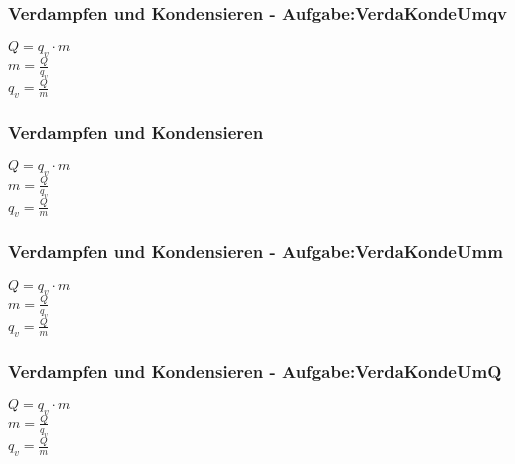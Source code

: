 \subsubsection{Verdampfen und Kondensieren - Aufgabe:VerdaKondeUmqv} 
\begin{minipage}{0.45\textwidth} 
$ Q =q_{v} \cdot m $\\ 
$ m = \frac{Q}{q_{v} } $\\ 
$ q_{v}  = \frac{Q}{m} $\\ 
\end{minipage} 
\begin{minipage}{0.45\textwidth} 
 
\end{minipage} 
\subsubsection{Verdampfen und Kondensieren} 
\begin{minipage}{0.45\textwidth} 
$ Q =q_{v} \cdot m $\\ 
$ m = \frac{Q}{q_{v} } $\\ 
$ q_{v}  = \frac{Q}{m} $\\ 
\end{minipage} 
\begin{minipage}{0.45\textwidth} 
 
\end{minipage} 
\subsubsection{Verdampfen und Kondensieren - Aufgabe:VerdaKondeUmm} 
\begin{minipage}{0.45\textwidth} 
$ Q =q_{v} \cdot m $\\ 
$ m = \frac{Q}{q_{v} } $\\ 
$ q_{v}  = \frac{Q}{m} $\\ 
\end{minipage} 
\begin{minipage}{0.45\textwidth} 
 
\end{minipage} 
\subsubsection{Verdampfen und Kondensieren - Aufgabe:VerdaKondeUmQ} 
\begin{minipage}{0.45\textwidth} 
$ Q =q_{v} \cdot m $\\ 
$ m = \frac{Q}{q_{v} } $\\ 
$ q_{v}  = \frac{Q}{m} $\\ 
\end{minipage} 
\begin{minipage}{0.45\textwidth} 
 
\end{minipage} 
